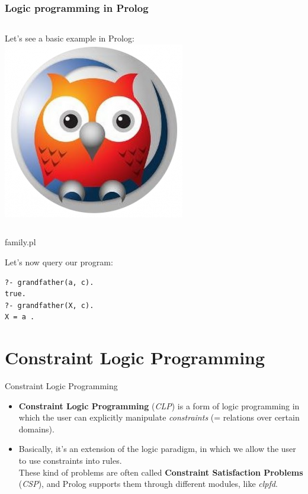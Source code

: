 \documentclass{beamer}
\begin{document}
\begin{frame}[fragile]
\frametitle{Logic programming in Prolog}
\begin{columns}
        	Let's see a basic example in Prolog:
			\includegraphics[scale=0.15]{img/logo_swipl.png}
	\end{columns}


\begin{exampleblock}{family.pl}
    
\end{exampleblock}

Let's now query our program:\\

\begin{lstlisting}
?- grandfather(a, c).
true.
?- grandfather(X, c).
X = a .
\end{lstlisting}

\end{frame}

\section{Constraint Logic Programming}
\begin{frame}{Constraint Logic Programming}

\begin{itemize}
\setlength\itemsep{2em}
\item \textbf{Constraint Logic Programming} (\emph{CLP}) is a form of logic programming in which the user can explicitly manipulate \emph{constraints} (= relations over certain domains).\\
\item Basically, it's an extension of the logic paradigm, in which we allow the user to use constraints into rules.\\
These kind of problems are often called \textbf{Constraint Satisfaction Problems} (\emph{CSP}), and Prolog supports them through different modules, like \emph{clpfd}.
\end{itemize}

\end{frame}
\end{document}
